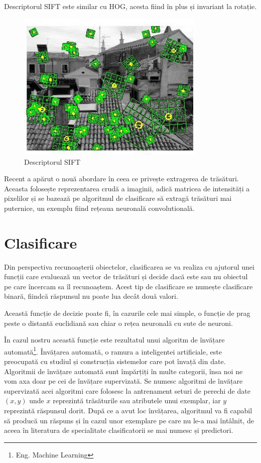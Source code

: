 Descriptorul SIFT este similar cu HOG, acesta fiind în plus și invariant la rotație.
\begin{figure}[H]
	\centering
		\includegraphics[width=0.80\textwidth]{imagini/sift0.jpg}
	\caption{Descriptorul SIFT\protect\footnotemark}
	\label{fig:sift}
\end{figure}

Recent a apărut o nouă abordare în ceea ce privește extragerea de trăsături.
Aceasta folosește reprezentarea crudă a imaginii, adică matricea de intensități a pixelilor și se bazează pe algoritmul de clasificare să extragă trăsături mai puternice, un exemplu fiind rețeaua neuronală convolutională\cite{lecun-98}.

\section{Clasificare}

Din perspectiva recunoașterii obiectelor, clasificarea se va realiza cu ajutorul unei funcții care evaluează un vector de trăsături și decide dacă este sau nu obiectul pe care încercam sa îl recunoaștem. 
Acest tip de clasificare se numește clasificare binară, fiindcă răspunsul nu poate lua decât două valori.

Această funcție de decizie poate fi, în cazurile cele mai simple, o funcție de prag peste o distantă euclidiană sau chiar o rețea neuronală cu sute de neuroni.

În cazul nostru această funcție este rezultatul unui algoritm de învățare automată\footnote{Eng. Machine Learning}.
Învățarea automată, o ramura a inteligentei artificiale, este preocupată cu studiul și construcția sistemelor care pot învață din date.
Algoritmii de învățare automată sunt împărțiți în multe categorii, însa noi ne vom axa doar pe cei de învățare supervizată.
Se numesc algoritmi de învățare supervizată acei algoritmi care folosesc la antrenament seturi de perechi de date ${(x,y)}$ unde ${x}$ reprezintă trăsăturile sau atributele unui exemplar, iar ${y}$ reprezintă răspunsul dorit. 
După ce a avut loc învățarea, algoritmul va fi capabil să producă un răspuns și în cazul unor exemplare pe care nu le-a mai întâlnit, de aceea în literatura de specialitate clasificatorii se mai numesc și predictori.

